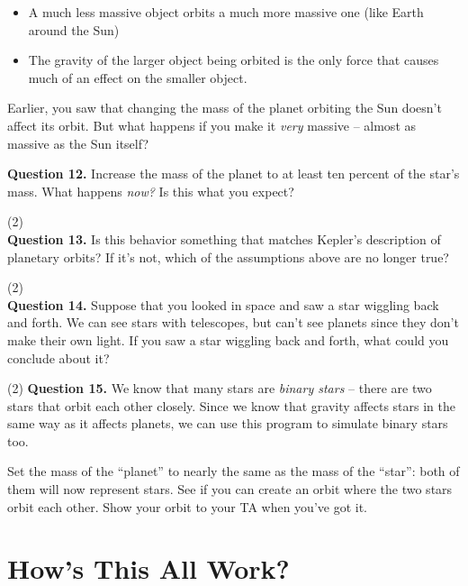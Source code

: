 \documentclass[11pt]{article}
\begin{document}
\begin{itemize}
	\item A much less massive object orbits a much more massive one (like Earth around the Sun)
	\item The gravity of the larger object being orbited is the only force that causes much of an effect on the smaller object. 
\end{itemize}

Earlier, you saw that changing the mass of the planet orbiting the Sun doesn't affect its orbit. But what happens if you make it {\it very} massive -- almost as massive as the Sun itself? 

\textbf{Question 12.} Increase the mass of the planet to at least ten percent of the star's mass. What happens {\it now?} Is this what you expect?

\vspace{1.5cm}

(2) \hrulefill\\


\textbf{Question 13.} Is this behavior something that matches Kepler's description of planetary orbits? If it's not, which of the assumptions above are no longer true?

\vspace{1.5cm}


(2) \hrulefill\\

\textbf{Question 14.} Suppose that you looked in space and saw a star wiggling back and forth. We can see stars with telescopes, but can't see planets since they don't make their own light. If you saw a star wiggling back and forth, what could you conclude about it?

\vspace{1.5cm}

(2) \textbf{Question 15.} We know that many stars are {\it binary stars} -- there are two stars that orbit each other closely. Since we know that gravity affects stars in the same way as it affects planets, we can use this program to simulate binary stars too. 

Set the mass of the ``planet'' to nearly the same as the mass of the ``star'': both of them will now represent stars. See if you can create an orbit where the two stars orbit each other. Show your orbit to your TA when you've got it.






\section{How's This All Work?}
\end{document}
